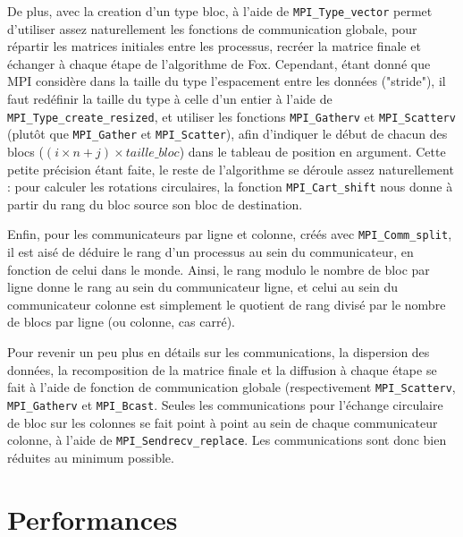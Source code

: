 \documentclass[a4paper,11pt]{article}
\begin{document}
De plus, avec la creation d'un type bloc, à l'aide de \texttt{MPI\_Type\_vector} permet d'utiliser assez naturellement les fonctions de communication globale, pour répartir les matrices initiales entre les processus, recréer la matrice finale et échanger à chaque étape de l'algorithme de Fox.
Cependant, étant donné que MPI considère dans la taille du type l'espacement entre les données ("stride"), il faut redéfinir la taille du type à celle d'un entier à l'aide de \texttt{MPI\_Type\_create\_resized}, et utiliser  les fonctions \texttt{MPI\_Gatherv} et \texttt{MPI\_Scatterv} (plutôt que \texttt{MPI\_Gather} et \texttt{MPI\_Scatter}), afin d'indiquer le début de chacun des blocs ($(i \times n + j) \times \mathit{taille\_bloc}$) dans le tableau de position en argument.
Cette petite précision étant faite, le reste de l'algorithme se déroule assez naturellement : pour calculer les rotations circulaires, la fonction \texttt{MPI\_Cart\_shift} nous donne à partir du rang du bloc source son bloc de destination.

Enfin, pour les communicateurs par ligne et colonne, créés avec \texttt{MPI\_Comm\_split}, il est aisé de déduire le rang d'un processus au sein du communicateur, en fonction de celui dans le monde.
Ainsi, le rang modulo le nombre de bloc par ligne donne le rang au sein du communicateur ligne, et celui au sein du communicateur colonne est simplement le quotient de rang divisé par le nombre de blocs par ligne (ou colonne, cas carré).

Pour revenir un peu plus en détails sur les communications, la dispersion des données, la recomposition de la matrice finale et la diffusion à chaque étape se fait à l'aide de fonction de communication globale (respectivement \texttt{MPI\_Scatterv}, \texttt{MPI\_Gatherv} et \texttt{MPI\_Bcast}.
Seules les communications pour l'échange circulaire de bloc sur les colonnes se fait point à point au sein de chaque communicateur colonne, à l'aide de \texttt{MPI\_Sendrecv\_replace}.
Les communications sont donc bien réduites au minimum possible.
 
\section{Performances}
\end{document}
